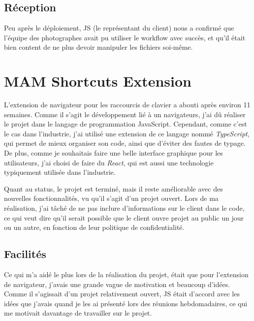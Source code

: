 \subsection*{Réception}

\begin{flushleft}
  Peu après le déploiement, JS (le représentant du client) nous a
  confirmé que l'équipe des photographes avait pu utiliser le workflow
  avec succès, et qu'il était bien content de ne plus devoir manipuler
  les fichiers soi-même.
\end{flushleft}

\newpage

\section{MAM Shortcuts Extension}

\begin{flushleft}
  L'extension de navigateur pour les raccourcis de
  clavier a abouti après environ 11 semaines.
  Comme il s'agit le développement lié à un navigateurs,
  j'ai dû réaliser le projet dans le langage de programmation
  JavaScript. Cependant, comme c'est le cas dans l'industrie,
  j'ai utilisé une extension de ce langage nommé \textit{TypeScript},
  qui permet de mieux organiser son code, ainsi que d'éviter des
  fautes de typage. De plus, comme je souhaitais faire une belle interface
  graphique pour les utilisateurs, j'ai choisi de faire du \textit{React},
  qui est aussi une technologie typiquement utilisée dans l'industrie.
\end{flushleft}

\begin{flushleft}
  Quant au status, le projet est terminé, mais il reste améliorable
  avec des nouvelles fonctionnalités, vu qu'il s'agit d'un projet
  ouvert. Lors de ma réalisation, j'ai tâché de ne pas inclure
  d'informations sur le client dans le code, ce qui veut dire qu'il
  serait possible que le client ouvre projet au public un jour ou
  un autre, en fonction de leur politique de confidentialité.
\end{flushleft}

\subsection*{Facilités}

\begin{flushleft}
  Ce qui m'a aidé le plus lors de la réalisation du projet, était
  que pour l'extension de navigateur, j'avais une grande vague de
  motivation et beaucoup d'idées. Comme il s'agissait d'un projet
  relativement ouvert, JS était d'accord avec les idées que j'avais
  quand je les ai présenté lors des réunions hebdomadaires, ce qui
  me motivait davantage de travailler sur le projet.
\end{flushleft}

